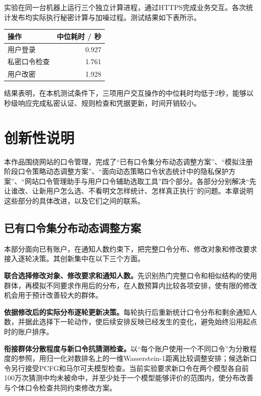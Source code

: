 \documentclass{crypto_report}
\begin{document}
实验在同一台机器上运行三个独立计算进程，通过HTTPS完成业务交互。各次统计发布均实际执行秘密计算与加噪过程。测试结果如下表所示。

\begin{table}[H]
\centering
\begin{tabular}{lr}
\toprule
操作 & 中位耗时 / 秒 \\
\midrule
用户登录 & 0.927 \\
私密口令检查 & 1.761 \\
用户改密 & 1.928 \\
\bottomrule
\end{tabular}
\end{table}

结果表明，在本机测试条件下，三项用户交互操作的中位耗时均低于2秒，能够以秒级响应完成私密认证、规则检查和凭据更新，时间开销较小。



\clearpage
\section{创新性说明}\label{ux7b2cux56dbux7ae0-ux521bux65b0ux6027ux8bf4ux660e}

本作品围绕网站的口令管理，完成了“已有口令集分布动态调整方案”、“模拟注册阶段口令策略动态调整方案”、“面向动态策略口令状态统计中的隐私保护方案”、“网站口令管理助手与用户口令辅助选取工具”四个部分。各部分分别解决“先让谁改、让新用户怎么选、不看明文怎样统计、怎样真正执行”的问题。本章说明这些部分的具体改进，以及它们之间的联系。

\subsection{已有口令集分布动态调整方案}\label{sec:innovation-1}

本部分面向已有账户，在通知人数约束下，把完整口令分布、修改对象和修改要求接入逐轮决策。其创新集中在以下三个方面。

\textbf{联合选择修改对象、修改要求和通知人数。}先识别热门完整口令和相似结构的使用群体，再模拟不同要求作用后的分布，在人数预算内比较各项安排，使有限的修改机会用于预计改善较大的群体。

\textbf{依据修改后的实际分布逐轮更新决策。}每轮执行后重新统计口令分布和剩余通知人数，并据此选择下一轮动作，使后续安排反映已经发生的变化，避免始终沿用起点时的账户排序。

\textbf{衔接群体分散程度与新口令抗猜测检查。}以“每个账户使用一个不同口令”为分散程度的参照，用归一化对数排名上的一维Wasserstein-1距离比较调整安排；候选新口令另行接受PCFG和马尔可夫模型检查。当前实验要求新口令在两个模型各自前100万次猜测中均未被命中，并至少处于一个模型能够评价的范围内，使分布改善与个体口令检查共同约束修改方案。
\end{document}
